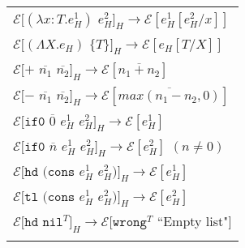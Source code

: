 \begin{figure}[ph!]
\centering
\begin{tabular}{l}
$\mathscr{E}[(\lambda x:T.e_{H}^{1})$ $e_{H}^{2}]_{H}\rightarrow\mathscr{E}[e_{H}^{1}[e_{H}^{2}/x]]$ \\

\vspace{5pt}

$\mathscr{E}[(\Lambda X.e_{H})$ $\lbrace T\rbrace]_{H}\rightarrow\mathscr{E}[e_{H}[T/X]]$ \\

\vspace{5pt}

$\mathscr{E}[+$ $\overline{n_{1}}$ $\overline{n_{2}}]_{H}\rightarrow\mathscr{E}[\overline{n_{1}+n_{2}}]$ \\

\vspace{5pt}

$\mathscr{E}[-$ $\overline{n_{1}}$ $\overline{n_{2}}]_{H}\rightarrow\mathscr{E}[\overline{max(n_{1}-n_{2},0)}]$ \\

\vspace{5pt}

$\mathscr{E}[\mathtt{if0}$ $\overline{0}$ $e_{H}^{1}$ $e_{H}^{2}]_{H}\rightarrow\mathscr{E}[e_{H}^{1}]$ \\

\vspace{5pt}

$\mathscr{E}[\mathtt{if0}$ $\overline{n}$ $e_{H}^{1}$ $e_{H}^{2}]_{H}\rightarrow\mathscr{E}[e_{H}^{2}]$ $(n\neq0)$ \\

\vspace{5pt}

$\mathscr{E}[\mathtt{hd}$ $(\mathtt{cons}$ $e_{H}^{1}$ $e_{H}^{2})]_{H}\rightarrow\mathscr{E}[e_{H}^{1}]$ \\

\vspace{5pt}

$\mathscr{E}[\mathtt{tl}$ $(\mathtt{cons}$ $e_{H}^{1}$ $e_{H}^{2})]_{H}\rightarrow\mathscr{E}[e_{H}^{2}]$ \\

\vspace{5pt}

$\mathscr{E}[\mathtt{hd}$ $\mathtt{nil}^{T}]_{H}\rightarrow\mathscr{E}[\mathtt{wrong}^{T}$ ``Empty list"$]$ \\

\vspace{5pt}


\end{tabular}
\end{figure}
